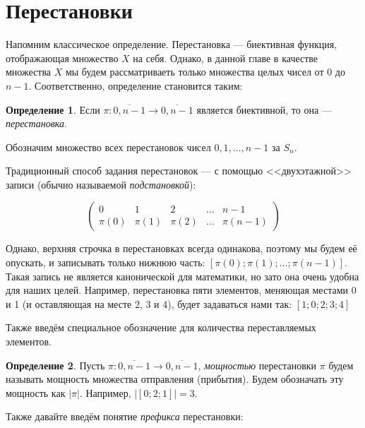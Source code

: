 \documentclass[12pt,a4paper,oneside]{article}
\begin{document}
\theoremstyle{definition}
\newtheorem{definition}{Определение}[section]

\theoremstyle{lemma}
\newtheorem{lemma}{Лемма}[section]

\section{Перестановки}

Напомним классическое определение. Перестановка --- биективная функция, отображающая 
множество $X$ на себя.
Однако, в данной главе в качестве множества $X$ мы будем рассматриваеть только 
множества целых чисел от $0$ до $n-1$. Соответственно, определение становится таким:

\begin{definition}
Если $\pi: \overline{0,n-1} \rightarrow \overline{0,n-1}$ является биективной,
то она --- \emph{перестановка}.
\end{definition}

\noindent Обозначим множество всех перестановок чисел $0,1,\dots,n-1$ за $S_n$.

\noindent Традиционный способ задания перестановок --- с помощью <<двухэтажной>> записи 
(обычно называемой \emph{подстановкой}):

$$
\left(\begin{array}{ccccc}
0 & 1 & 2 & \dots & n-1\\
\pi(0) & \pi(1) & \pi(2) & \dots & \pi(n-1)
\end{array}\right)
$$

Однако, верхняя строчка в перестановках всегда одинакова, поэтому мы будем её опускать,
и записывать только нижнюю часть: $[\pi(0);\pi(1);\dots;\pi(n-1)]$. Такая запись не является
канонической для математики, но зато она очень удобна для наших целей.
Например, перестановка пяти элементов, меняющая местами 0 и 1 (и оставляющая на месте 2, 3 и 4), 
будет задаваться нами так: $[1;0;2;3;4]$

Также введём специальное обозначение для количества переставляемых элементов.

\begin{definition}
Пусть $\pi: \overline{0,n-1} \rightarrow \overline{0,n-1}$, \emph{мощностью}
перестановки $\pi$ будем называть мощность множества отправления (прибытия).
Будем обозначать эту мощность как $|\pi|$.
Например, $|[0;2;1]| = 3$. 
\end{definition}

Также давайте введём понятие \emph{префикса} перестановки: 
\end{document}
